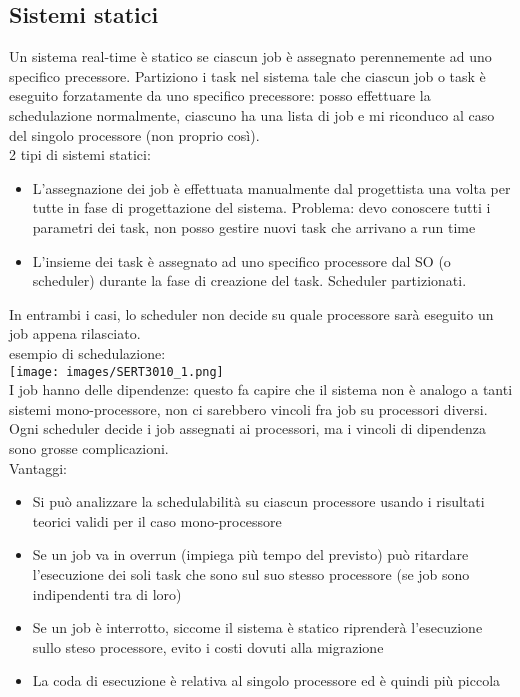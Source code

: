 \documentclass[18px]{article}
\begin{document}
\subsection{Sistemi statici}
Un sistema real-time è statico se ciascun job è assegnato perennemente ad uno specifico precessore. Partiziono i task nel sistema tale che ciascun job o task è eseguito forzatamente da uno specifico precessore: posso effettuare la schedulazione normalmente, ciascuno ha una lista di job e mi riconduco al caso del singolo processore (non proprio così).\\ 2 tipi di sistemi statici:
\begin{itemize}
\item L'assegnazione dei job è effettuata manualmente dal progettista una volta per tutte in fase di progettazione del sistema. Problema: devo conoscere tutti i parametri dei task, non posso gestire nuovi task che arrivano a run time
\item L'insieme dei task è assegnato ad uno specifico processore dal SO (o scheduler) durante la fase di creazione del task. Scheduler partizionati.
\end{itemize}
In entrambi i casi, lo scheduler non decide su quale processore sarà eseguito un job appena rilasciato.\\ esempio di schedulazione:\\
\texttt{[image: images/SERT3010\_1.png]}\\ I job hanno delle dipendenze: questo fa capire che il sistema non è analogo a tanti sistemi mono-processore, non ci sarebbero vincoli fra job su processori diversi. Ogni scheduler decide i job assegnati ai processori, ma i vincoli di dipendenza sono grosse complicazioni.\\ Vantaggi:
\begin{itemize}
\item Si può analizzare la schedulabilità su  ciascun processore usando i risultati teorici validi per il caso mono-processore
\item Se un job va in overrun (impiega più tempo del previsto) può ritardare l'esecuzione dei soli task che sono sul suo stesso processore (se job sono indipendenti tra di loro)
\item Se un job è interrotto, siccome il sistema è statico riprenderà l'esecuzione sullo steso processore, evito i costi dovuti alla migrazione
\item La coda di esecuzione è relativa al singolo processore ed è quindi più piccola
\end{itemize}
\end{document}
